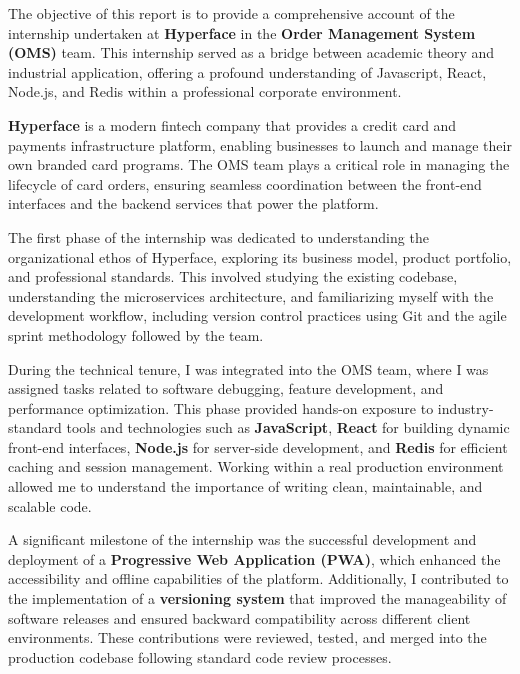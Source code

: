 \vspace{-1cm}

The objective of this report is to provide a comprehensive account of the internship undertaken at \textbf{Hyperface} in the \textbf{Order Management System (OMS)} team. This internship served as a bridge between academic theory and industrial application, offering a profound understanding of Javascript, React, Node.js, and Redis within a professional corporate environment.

\textbf{Hyperface} is a modern fintech company that provides a credit card and payments infrastructure platform, enabling businesses to launch and manage their own branded card programs. The OMS team plays a critical role in managing the lifecycle of card orders, ensuring seamless coordination between the front-end interfaces and the backend services that power the platform.

The first phase of the internship was dedicated to understanding the organizational ethos of Hyperface, exploring its business model, product portfolio, and professional standards. This involved studying the existing codebase, understanding the microservices architecture, and familiarizing myself with the development workflow, including version control practices using Git and the agile sprint methodology followed by the team.

During the technical tenure, I was integrated into the OMS team, where I was assigned tasks related to software debugging, feature development, and performance optimization. This phase provided hands-on exposure to industry-standard tools and technologies such as \textbf{JavaScript}, \textbf{React} for building dynamic front-end interfaces, \textbf{Node.js} for server-side development, and \textbf{Redis} for efficient caching and session management. Working within a real production environment allowed me to understand the importance of writing clean, maintainable, and scalable code.

A significant milestone of the internship was the successful development and deployment of a \textbf{Progressive Web Application (PWA)}, which enhanced the accessibility and offline capabilities of the platform. Additionally, I contributed to the implementation of a \textbf{versioning system} that improved the manageability of software releases and ensured backward compatibility across different client environments. These contributions were reviewed, tested, and merged into the production codebase following standard code review processes.

